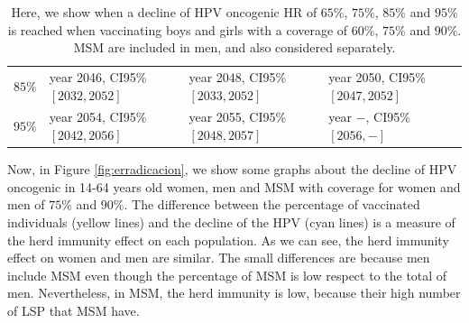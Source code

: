 \begin{table}[!h]
\begin{tabular}{c|lll}
$ 85 \%$ & year 2046, CI95\% $[ 2032 , 2052 ]$ & year 2048, CI95\% $[ 2033 , 2052 ]$ & year 2050, CI95\% $[ 2047 , 2052 ]$ \\
$ 95 \%$ & year 2054, CI95\% $[ 2042 , 2056 ]$ & year 2055, CI95\% $[ 2048 , 2057 ]$ & year $-$, CI95\% $[ 2056 , - ]$
	\end{tabular} 
	\caption{Here, we show when a decline of HPV oncogenic HR of $65\%$, $75\%$, $85\%$ and $95\%$ is reached when vaccinating boys and girls with a coverage of $60\%$, $75\%$ and $90\%$. MSM are included in men, and also considered separately.}
	\label{tabla:decline_HR_onco}
\end{table}

Now, in Figure \ref{fig:erradicacion}, we show some graphs about the decline of HPV oncogenic in 14-64 years old women, men and MSM with coverage for women and men of $75\%$ and $90\%$. The difference between the percentage of vaccinated individuals (yellow lines) and the decline of the HPV (cyan lines) is a measure of the herd immunity effect on each population. As we can see, the herd immunity effect on women and men are similar. The small differences are because men include MSM even though the percentage of MSM is low respect to the total of men. Nevertheless, in MSM, the herd immunity is low, because their high number of LSP that MSM have.  

